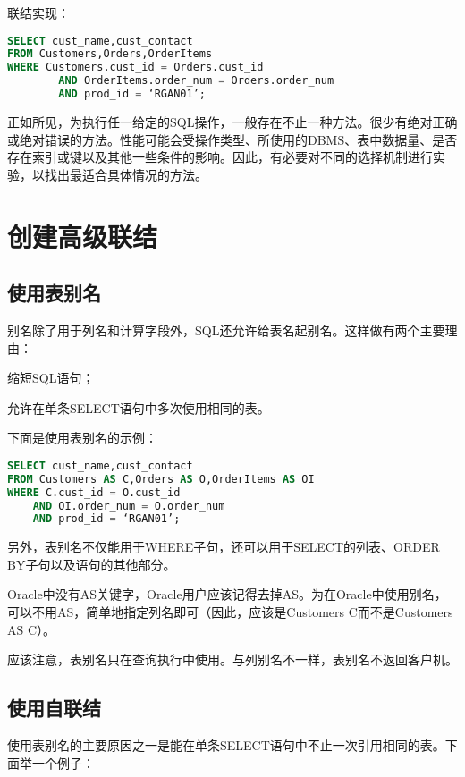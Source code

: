 联结实现：

\begin{lstlisting}[language=SQL]
SELECT cust_name,cust_contact
FROM Customers,Orders,OrderItems
WHERE Customers.cust_id = Orders.cust_id
		AND OrderItems.order_num = Orders.order_num
		AND prod_id = ‘RGAN01’;
\end{lstlisting}

正如所见，为执行任一给定的SQL操作，一般存在不止一种方法。很少有绝对正确或绝对错误的方法。性能可能会受操作类型、所使用的DBMS、表中数据量、是否存在索引或键以及其他一些条件的影响。因此，有必要对不同的选择机制进行实验，以找出最适合具体情况的方法。
\section{创建高级联结}
\subsection{使用表别名}

别名除了用于列名和计算字段外，SQL还允许给表名起别名。这样做有两个主要理由：

\begin{compactitem}
\item 缩短SQL语句；
\item 允许在单条SELECT语句中多次使用相同的表。
\end{compactitem}

下面是使用表别名的示例：

\begin{lstlisting}[language=SQL]
SELECT cust_name,cust_contact
FROM Customers AS C,Orders AS O,OrderItems AS OI
WHERE C.cust_id = O.cust_id
	AND OI.order_num = O.order_num
	AND prod_id = ‘RGAN01’;
\end{lstlisting}

另外，表别名不仅能用于WHERE子句，还可以用于SELECT的列表、ORDER BY子句以及语句的其他部分。

Oracle中没有AS关键字，Oracle用户应该记得去掉AS。为在Oracle中使用别名，可以不用AS，简单地指定列名即可（因此，应该是Customers C而不是Customers AS C）。

应该注意，表别名只在查询执行中使用。与列别名不一样，表别名不返回客户机。
\subsection{使用自联结}

使用表别名的主要原因之一是能在单条SELECT语句中不止一次引用相同的表。下面举一个例子：

